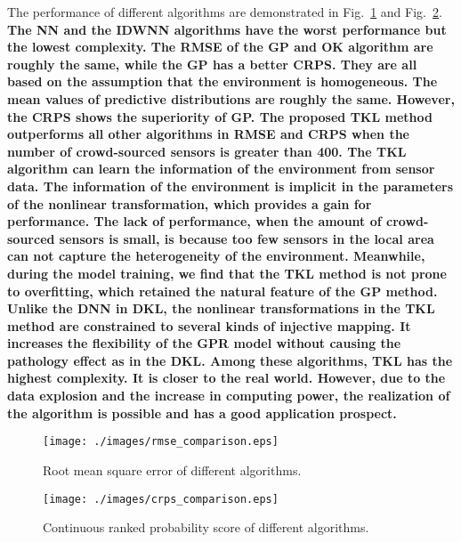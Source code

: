 \documentclass[journal, oneside, twocolumn]{IEEEtran}
\newcommand{\bl}[1]{\bf\color{blue}#1}
\begin{document}
The performance of different algorithms are demonstrated in Fig.~\ref{fig:rmse} and Fig.~\ref{fig:crps}. {\bl The NN and the IDWNN algorithms have the worst performance but the lowest complexity.
The RMSE of the GP and OK algorithm are roughly the same, while the GP has a better CRPS. They are all based on the assumption that the environment is homogeneous. The mean values of predictive distributions are roughly the same. However, the CRPS shows the superiority of GP. The proposed TKL method outperforms all other algorithms in RMSE and CRPS when the number of crowd-sourced sensors is greater than 400. The TKL algorithm can learn the information of the environment from sensor data. The information of the environment is implicit in the parameters of the nonlinear transformation, which provides a gain for performance. The lack of performance, when the amount of crowd-sourced sensors is small, is because too few sensors in the local area can not capture the heterogeneity of the environment.
Meanwhile, during the model training, we find that the TKL method is not prone to overfitting, which retained the natural feature of the GP method\cite{Rasmussen2006}. Unlike the DNN in DKL, the nonlinear transformations in the TKL method are constrained to several kinds of injective mapping. It increases the flexibility of the GPR model without causing the pathology effect as in the DKL\cite{Ober2021}. Among these algorithms, TKL has the highest complexity. It is closer to the real world. However, due to the data explosion and the increase in computing power, the realization of the algorithm is possible and has a good application prospect.}

\begin{figure}[!tb]
  \centering
  \texttt{[image: ./images/rmse\_comparison.eps]}
  \caption{Root mean square error of different algorithms.}
  \label{fig:rmse}
\end{figure}

\begin{figure}[!tb]
  \centering
  \texttt{[image: ./images/crps\_comparison.eps]}
  \caption{Continuous ranked probability score of different algorithms.}
  \label{fig:crps}
\end{figure}
\end{document}
